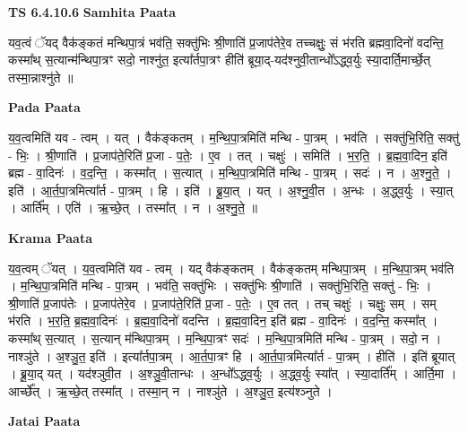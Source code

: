 \documentclass[17pt]{extarticle}
\begin{document}
\textbf{TS 6.4.10.6 } \newline
\textbf{Samhita Paata} \newline

यव॒त्वं ॅयद् वैक॑ङ्कतं मन्थिपा॒त्रं भव॑ति॒ सक्तु॑भिः श्री॒णाति॑ प्र॒जाप॑तेरे॒व तच्चक्षुः॒ सं भ॑रति ब्रह्मवा॒दिनो॑ वदन्ति॒ कस्मा᳚थ् स॒त्यान्म॑न्थिपा॒त्रꣳ सदो॒ नाश्नु॑त॒ इत्या᳚र्तपा॒त्रꣳ हीति॑ ब्रूया॒द्-यद॑श्नुवी॒तान्धो᳚ऽद्ध्व॒र्युः स्या॒दार्ति॒मार्च्छे॒त् तस्मा॒न्नाश्नु॑ते ॥ \newline

\textbf{Pada Paata} \newline

य॒व॒त्वमिति॑ यव - त्वम् । यत् । वैक॑ङ्कतम् । म॒न्थि॒पा॒त्रमिति॑ मन्थि - पा॒त्रम् । भव॑ति । सक्तु॑भि॒रिति॒ सक्तु॑ - भिः॒ । श्री॒णाति॑ । प्र॒जाप॑ते॒रिति॑ प्र॒जा - प॒तेः॒ । ए॒व । तत् । चक्षुः॑ । समिति॑ । भ॒र॒ति॒ । ब्र॒ह्म॒वा॒दिन॒ इति॑ ब्रह्म - वा॒दिनः॑ । व॒द॒न्ति॒ । कस्मा᳚त् । स॒त्यात् । म॒न्थि॒पा॒त्रमिति॑ मन्थि - पा॒त्रम् । सदः॑ । न । अ॒श्नु॒ते॒ । इति॑ । आ॒र्त॒पा॒त्रमित्या᳚र्त - पा॒त्रम् । हि । इति॑ । ब्रू॒या॒त् । यत् । अ॒श्नु॒वी॒त । अ॒न्धः । अ॒द्ध्व॒र्युः । स्या॒त् । आर्ति᳚म् । एति॑ । ऋ॒च्छे॒त् । तस्मा᳚त् । न । अ॒श्नु॒ते॒ ॥  \newline


\textbf{Krama Paata} \newline

य॒व॒त्वम् ॅयत् । य॒व॒त्वमिति॑ यव - त्वम् । यद् वैक॑ङ्‍कतम् । वैक॑ङ्‍कतम् मन्थिपा॒त्रम् । म॒न्थि॒पा॒त्रम् भव॑ति । म॒न्थि॒पा॒त्रमिति॑ मन्थि - पा॒त्रम् । भव॑ति॒ सक्तु॑भिः । सक्तु॑भिः श्री॒णाति॑ । सक्तु॑भि॒रिति॒ सक्तु॑ - भिः॒ । श्री॒णाति॑ प्र॒जाप॑तेः । प्र॒जाप॑तेरे॒व । प्र॒जाप॑ते॒रिति॑ प्र॒जा - प॒तेः॒ । ए॒व तत् । तच् चक्षुः॑ । चक्षुः॒ सम् । सम् भ॑रति । भ॒र॒ति॒ ब्र॒ह्म॒वा॒दिनः॑ । ब्र॒ह्म॒वा॒दिनो॑ वदन्ति । ब्र॒ह्म॒वा॒दिन॒ इति॑ ब्रह्म - वा॒दिनः॑ । व॒द॒न्ति॒ कस्मा᳚त् । कस्मा᳚थ् स॒त्यात् । स॒त्यान् म॑न्थिपा॒त्रम् । म॒न्थि॒पा॒त्रꣳ सदः॑ । म॒न्थि॒पा॒त्रमिति॑ मन्थि - पा॒त्रम् । सदो॒ न । नाश्ञु॑ते । अ॒श्ञु॒त॒ इति॑ । इत्या᳚र्तपा॒त्रम् । आ॒र्त॒पा॒त्रꣳ हि । आ॒र्त॒पा॒त्रमित्या᳚र्त - पा॒त्रम् । हीति॑ । इति॑ ब्रूयात् । ब्रू॒या॒द् यत् । यद॑श्ञुवी॒त । अ॒श्ञु॒वी॒तान्धः । अ॒न्धो᳚ऽद्ध्व॒र्युः । अ॒द्ध्व॒र्युः स्या᳚त् । स्या॒दार्ति᳚म् । आर्ति॒मा । आर्च्छे᳚त् । ऋ॒च्छे॒त् तस्मा᳚त् । तस्मा॒न् न । नाश्ञु॑ते । अ॒श्ञु॒त॒ इत्य॑श्ञ्नुते । \newline

\textbf{Jatai Paata} \newline
\end{document}
